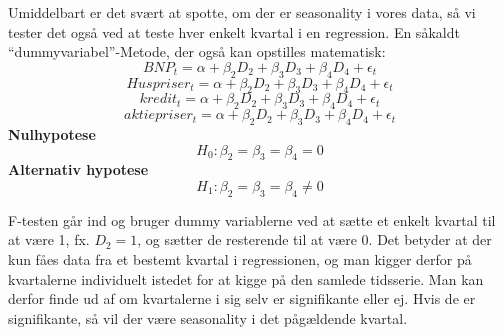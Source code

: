 \documentclass[
  10pt,
]{article}
\begin{document}
Umiddelbart er det svært at spotte, om der er seasonality i vores data,
så vi tester det også ved at teste hver enkelt kvartal i en regression.
En såkaldt ``dummyvariabel''-Metode, der også kan opstilles matematisk:
\[BNP_t = \alpha+\beta_2D_2+\beta_3D_3+\beta_4D_4+\epsilon_t\]
\[Huspriser_t = \alpha+\beta_2D_2+\beta_3D_3+\beta_4D_4+\epsilon_t\]
\[kredit_t = \alpha+\beta_2D_2+\beta_3D_3+\beta_4D_4+\epsilon_t\]
\[aktiepriser_t = \alpha+\beta_2D_2+\beta_3D_3+\beta_4D_4+\epsilon_t\]
\textbf{Nulhypotese} \[
H_0 : \beta_2 = \beta_3 = \beta_4 = 0 
\tag{No seasonality} \] \textbf{Alternativ hypotese} \[
H_1 : \beta_2 = \beta_3 = \beta_4 \neq 0 
\tag{Seasonality} \]

F-testen går ind og bruger dummy variablerne ved at sætte et enkelt
kvartal til at være 1, fx. \(D_2=1\), og sætter de resterende til at
være 0. Det betyder at der kun fåes data fra et bestemt kvartal i
regressionen, og man kigger derfor på kvartalerne individuelt istedet
for at kigge på den samlede tidsserie. Man kan derfor finde ud af om
kvartalerne i sig selv er signifikante eller ej. Hvis de er
signifikante, så vil der være seasonality i det pågældende kvartal.
\end{document}
